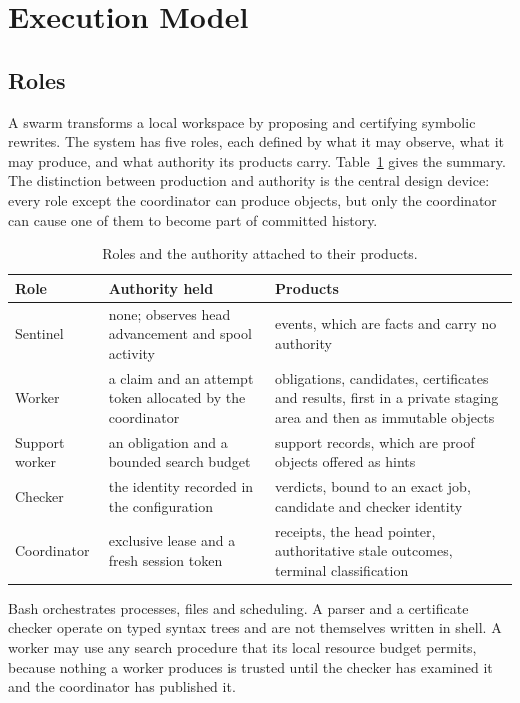 \documentclass[11pt,a4paper]{article}
\theoremstyle{plain}
\theoremstyle{definition}
\theoremstyle{remark}
\theoremstyle{definition}
\begin{document}
\section{Execution Model}
\label{sec:execution}

\subsection{Roles}

A swarm transforms a local workspace by proposing and certifying symbolic rewrites. The system has five roles, each defined by what it may observe, what it may produce, and what authority its products carry. Table~\ref{tab:roles} gives the summary. The distinction between production and authority is the central design device: every role except the coordinator can produce objects, but only the coordinator can cause one of them to become part of committed history.

\begin{table}[t]
\centering\small
\begin{tabular}{@{}p{2.2cm}p{4.0cm}p{4.2cm}@{}}
\toprule
Role & Authority held & Products \\
\midrule
Sentinel & none; observes head advancement and spool activity & events, which are facts and carry no authority \\
Worker & a claim and an attempt token allocated by the coordinator & obligations, candidates, certificates and results, first in a private staging area and then as immutable objects \\
Support worker & an obligation and a bounded search budget & support records, which are proof objects offered as hints \\
Checker & the identity recorded in the configuration & verdicts, bound to an exact job, candidate and checker identity \\
Coordinator & exclusive lease and a fresh session token & receipts, the head pointer, authoritative stale outcomes, terminal classification \\
\bottomrule
\end{tabular}
\caption{Roles and the authority attached to their products.}
\label{tab:roles}
\end{table}

Bash orchestrates processes, files and scheduling. A parser and a certificate checker operate on typed syntax trees and are not themselves written in shell. A worker may use any search procedure that its local resource budget permits, because nothing a worker produces is trusted until the checker has examined it and the coordinator has published it.
\end{document}
